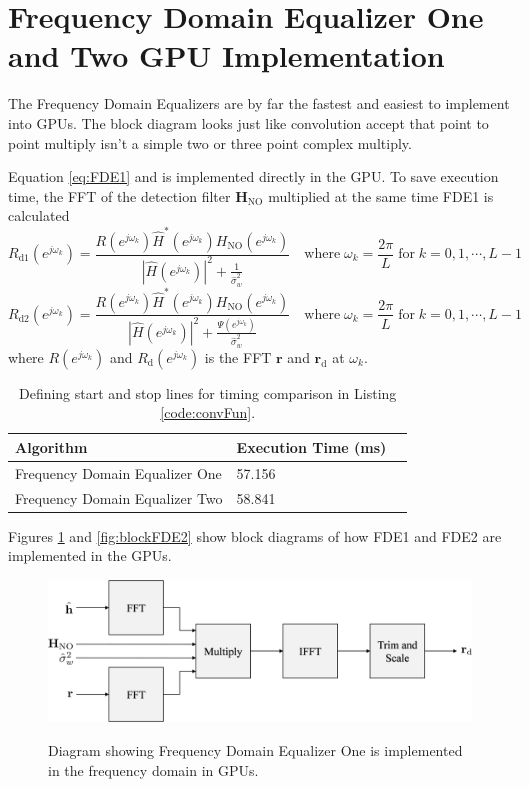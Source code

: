 \section{Frequency Domain Equalizer One and Two GPU Implementation}
The Frequency Domain Equalizers are by far the fastest and easiest to implement into GPUs.
The block diagram looks just like convolution accept that point to point multiply isn't a simple two or three point complex multiply.

Equation \ref{eq:FDE1} and is implemented directly in the GPU.
To save execution time, the FFT of the detection filter $\mathbf{H}_{\text{NO}}$ multiplied at the same time FDE1 is calculated 
\begin{equation}
R_\text{d1}(e^{j\omega_k}) = \frac{R(e^{j\omega_k}) \hat{H}^\ast(e^{j\omega_k}) H_{\text{NO}}(e^{j\omega_k})}  {|\hat{H}(e^{j\omega_k})|^2  +  \frac{1}{\hat{\sigma}^2_w}} \quad
\text{where} \;
\omega_k = \frac{2\pi}{L} \;
\text{for} \;
k=0,1,\cdots,L-1
\label{eq:FDE1_applied}
\end{equation}
\begin{equation}
R_\text{d2}(e^{j\omega_k}) = \frac{R(e^{j\omega_k}) \hat{H}^\ast(e^{j\omega_k}) H_{\text{NO}}(e^{j\omega_k})}  {|\hat{H}(e^{j\omega_k})|^2  +  \frac{\Psi(e^{j\omega_k})}{\hat{\sigma}^2_w}} \quad
\text{where} \;
\omega_k = \frac{2\pi}{L} \;
\text{for} \;
k=0,1,\cdots,L-1
\label{eq:FDE2_applied}
\end{equation}
where $R(e^{j\omega_k})$ and $R_\text{d}(e^{j\omega_k})$ is the FFT $\mathbf{r}$ and $\mathbf{r}_\text{d}$ 
at $\omega_k$.
\begin{table}
\caption{Defining start and stop lines for timing comparison in Listing \ref{code:convFun}.}
\begin{center}
\begin{tabular}{lll}
	\toprule
	Algorithm						& Execution Time (ms)	\\ \midrule
	Frequency Domain Equalizer One 	& 57.156				\\
	Frequency Domain Equalizer Two	& 58.841				\\
	\bottomrule
\end{tabular}
\end{center}
\label{tab:CMAtimingComparison}
\end{table}
Figures \ref{fig:blockFDE1} and \ref{fig:blockFDE2} show block diagrams of how FDE1 and FDE2 are implemented in the GPUs.
\begin{figure}
	\caption{Diagram showing Frequency Domain Equalizer One is implemented in the frequency domain in GPUs.}
	\centering\includegraphics[width=9.73in/100*55]{figures/eq_GPUimplementation/blockFDE1.pdf}
	\label{fig:blockFDE1}
\end{figure}
